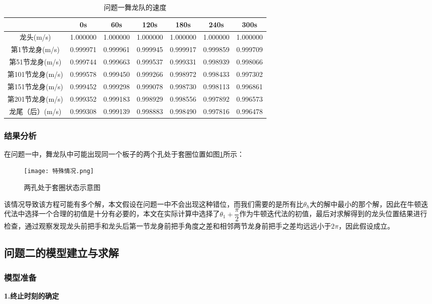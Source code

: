 \documentclass[withoutpreface,bwprint]{cumcmthesis} %
\begin{document}
	\begin{table}[H]
		\centering
		\setlength{\tabcolsep}{10pt}
		\caption{问题一舞龙队的速度} 
		\label{问题一速度} 
		\setlength\extrarowheight{-3pt}
		\small
		\begin{tabular}{|c|c|c|c|c|c|c|}
			\hline
			& 0s & 60s & 120s & 180s & 240s & 300s \\ \hline
			龙头(m/s)     &  1.000000  & 1.000000 & 1.000000 & 1.000000 & 1.000000 & 1.000000 \\ \hline
			第1节龙身(m/s)  &  0.999971  & 0.999961 & 0.999945& 0.999917 & 0.999859 & 0.999709     \\ \hline
			第51节龙身(m/s) &  0.999744 &0.999663 & 0.999537 & 0.999331 &0.998939 & 0.998066     \\ \hline
			第101节龙身(m/s)   & 0.999578  &0.999450&0.999266&0.998972&0.998433 & 0.997302     \\ \hline
			第151节龙身(m/s)   &  0.999452  &0.999298& 0.999078 & 0.998730 &0.998113&  0.996861    \\ \hline
			第201节龙身(m/s)   & 0.999352 &0.999183&0.998929& 0.998556& 0.997892& 0.996573     \\ \hline
			龙尾（后）(m/s)   & 0.999308 &0.999139& 0.998883 & 0.998490 &0.997816&  0.996478  \\ \hline
		\end{tabular}
	\end{table}
	\subsubsection{结果分析}	
	在问题一中，舞龙队中可能出现同一个板子的两个孔处于套圈位置如图\ref{特殊}所示：
	\begin{figure}[H]
		\centering
		\texttt{[image: 特殊情况.png]}
		\caption{两孔处于套圈状态示意图}
		\label{特殊} %
	\end{figure}
	该情况导致该方程可能有多个解，本文假设在问题一中不会出现这种错位，而我们需要的是所有比$\theta_h$大的解中最小的那个解，因此在牛顿迭代法中选择一个合理的初值是十分有必要的，本文在实际计算中选择了$\theta_1+\dfrac{\pi}{2}$作为牛顿迭代法的初值，最后对求解得到的龙头位置结果进行检查，通过观察发现龙头前把手和龙头后第一节龙身前把手角度之差和相邻两节龙身前把手之差均远远小于$2\pi$，因此假设成立。

	\subsection{问题二的模型建立与求解}
	\subsubsection{模型准备}
	\textbf{1.终止时刻的确定}
	
\end{document}
